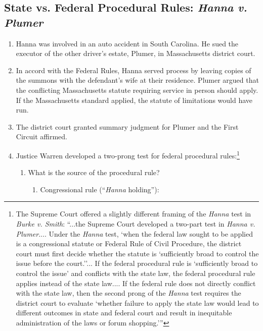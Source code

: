 \subsection{State vs. Federal Procedural Rules: \emph{Hanna v. Plumer}}

\begin{enumerate}
    \item Hanna was involved in an auto accident in South Carolina. He sued 
    the executor of the other driver's estate, Plumer, in Massachusetts 
    district court.
    \item In accord with the Federal Rules, Hanna served process by leaving 
    copies of the summons with the defendant's wife at their residence. Plumer 
    argued that the conflicting Massachusetts statute requiring service in 
    person should apply. If the Massachusetts standard applied, the statute of 
    limitations would have run.
    \item The district court granted summary judgment for Plumer and the First 
    Circuit affirmed.
    \item Justice Warren developed a two-prong test for federal procedural 
    rules:\footnote{The Supreme Court offered a slightly different framing of 
    the \emph{Hanna} test in \emph{Burke v. Smith}:
    \enquote{...the Supreme Court developed a two-part test in \emph{Hanna v.  
    Plumer}.... Under the \emph{Hanna} test, \enquote{when the federal law 
    sought to be applied is a congressional statute or Federal Rule of Civil 
    Procedure, the district court must first decide whether the statute is 
    `sufficiently broad to control the issue before the court.'}...  
    If the federal procedural rule is \enquote{sufficiently broad to control 
    the issue} and conflicts with the state law, the federal procedural rule 
    applies instead of the state law.... If the federal rule does not directly 
    conflict with the state law, then the second prong of the \emph{Hanna} 
    test requires the district court to evaluate \enquote{whether failure to 
    apply the state law would lead to different outcomes in state and federal 
    court and result in inequitable administration of the laws or forum 
    shopping.}}}
    \begin{enumerate}
        \item What is the source of the procedural rule?
        \begin{enumerate}
            \item Congressional rule (``\emph{Hanna} holding''):
            \begin{itemize}

\end{itemize}
\end{enumerate}
\end{enumerate}
\end{enumerate}

